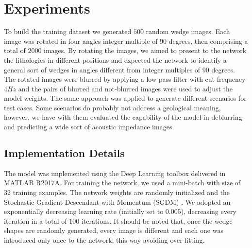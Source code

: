 \documentclass[conference,compsoc]{IEEEtran}
\begin{document}
\section{Experiments}
To build the training dataset we generated $500$ random wedge 
images. Each image was rotated in four angles integer multiple of $90$
degrees, then comprising a total of $2000$ images. 
By rotating the images, we aimed to present to the network the 
lithologies in different positions and expected the network
to identify a general sort of wedges in angles different from integer
multiples of $90$ degrees. The rotated images were blurred by applying a low-pass filter with
cut frequency $4Hz$ and the pairs of blurred and not-blurred images were used to
adjust the model weights. The same approach was applied to generate different
scenarios for test cases. Some scenarios do probably not
address a geological meaning, however, we have with them evaluated the capability of the model
in deblurring and predicting a wide sort of acoustic impedance images.


\subsection{Implementation Details}
The model was implemented using the Deep Learning toolbox
delivered in MATLAB R2017A. For training the network, we used a mini-batch with size of $32$ training examples.
The network weights are randomly initialized and the Stochastic Gradient Descendant with
Momentum (SGDM) \cite{Ning}. We adopted an exponentially decreasing learning rate (initially
set to $0.005$), decreasing every iteration in a total of $100$ iterations.
It should be noted that, once the wedge shapes are randomly generated, every image is different
and each one was introduced only once to the network, this way avoiding over-fitting.
\end{document}
